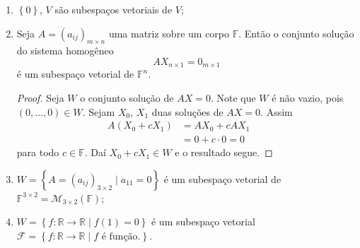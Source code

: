 \begin{example}
	\begin{enumerate}\leavevmode
		\item

		      $\left\{0\right\}$, $V$ são subespaços vetoriais de $V$;

		\item

		      Seja $A={\left(a_{ij}\right)}_{m\times n}$ uma matriz sobre
		      um corpo $\mathbb{F}$.
		      Então o conjunto solução do sistema homogêneo
		      \[
			      A
				      {X}_{n\times1}=
			      {0}_{m\times1}
		      \]
		      é um subespaço vetorial de $\mathbb{F}^{n}$.

		      \begin{proof}
			      Seja $W$ o conjunto solução de $AX=0$.
			      Note que $W$ é não vazio, pois
			      $\left(0,\dotsc,0\right)\in W$.
			      Sejam $X_{0}$, $X_{1}$ duas soluções de $AX=0$.
			      Assim
			      \begin{align*}
				      A\left(X_{0}+cX_{1}\right)
				       & =AX_{0}+cAX_{1} &  & \\
				       & =0 + c\cdot 0=0 &  &
			      \end{align*}
			      para todo $c\in\mathbb{F}$.
			      Daí $X_{0}+cX_{1}\in W$ e o resultado segue.
		      \end{proof}

		\item

		      \begin{math}
			      W=
			      \left\{
			      A=
			      {\left(a_{ij}\right)}_{3\times2}
			      \mid a_{11}=0
			      \right\}
		      \end{math}
		      é um subespaço vetorial de
		      \begin{math}
			      \mathbb{F}^{3\times2}=
			      \mathcal{M}_{3\times2}\left(\mathbb{F}\right)
		      \end{math};

		\item

		      \begin{math}
			      W=
			      \left\{
			      f\colon
			      \mathbb{R}\to\mathbb{R}
			      \mid f\left(1\right)=0
			      \right\}
		      \end{math}
		      é um subespaço vetorial
		      \begin{math}
			      \mathcal{F}=
			      \left\{
			      f\colon
			      \mathbb{R}\to\mathbb{R}
			      \mid f\text{ é função.}
			      \right\}
		      \end{math}.
	\end{enumerate}
\end{example}


